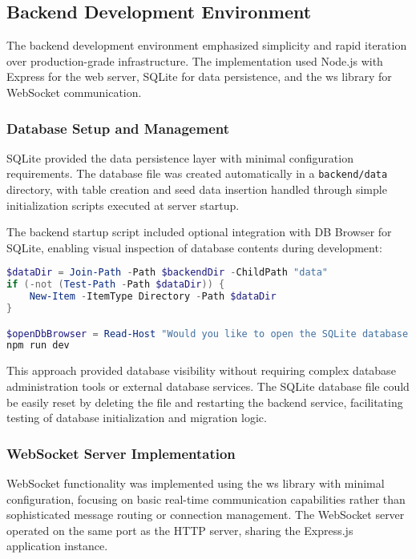 \documentclass[12pt,a4paper]{report}
\begin{document}
\subsection{Backend Development Environment}

The backend development environment emphasized simplicity and rapid iteration over production-grade infrastructure. The implementation used Node.js with Express for the web server, SQLite for data persistence, and the ws library for WebSocket communication.

\subsubsection{Database Setup and Management}

SQLite provided the data persistence layer with minimal configuration requirements. The database file was created automatically in a \texttt{backend/data} directory, with table creation and seed data insertion handled through simple initialization scripts executed at server startup.

The backend startup script included optional integration with DB Browser for SQLite, enabling visual inspection of database contents during development:

\begin{lstlisting}[language=PowerShell, caption=Backend Development Script with Database Tools]
$dataDir = Join-Path -Path $backendDir -ChildPath "data"
if (-not (Test-Path -Path $dataDir)) {
    New-Item -ItemType Directory -Path $dataDir
}

$openDbBrowser = Read-Host "Would you like to open the SQLite database in DB Browser? (y/n)"
npm run dev
\end{lstlisting}

This approach provided database visibility without requiring complex database administration tools or external database services. The SQLite database file could be easily reset by deleting the file and restarting the backend service, facilitating testing of database initialization and migration logic.

\subsubsection{WebSocket Server Implementation}

WebSocket functionality was implemented using the ws library with minimal configuration, focusing on basic real-time communication capabilities rather than sophisticated message routing or connection management. The WebSocket server operated on the same port as the HTTP server, sharing the Express.js application instance.
\end{document}
